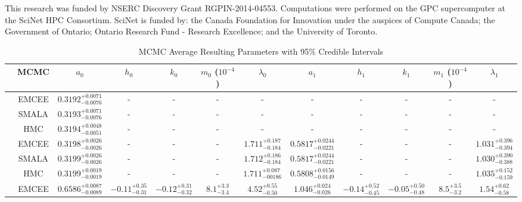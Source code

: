 \documentclass{aa}
\begin{document}
\begin{acknowledgements}
	This research was funded by NSERC Discovery Grant RGPIN-2014-04553. 
Computations were performed on the GPC supercomputer at the SciNet HPC Consortium. 
SciNet is funded by: the Canada Foundation for Innovation under the auspices of Compute Canada; the Government of Ontario; Ontario Research Fund - Research Excellence; and the University of Toronto.
\end{acknowledgements}






\begin{appendix} 

\begin{sidewaystable*}
\caption{MCMC Average Resulting Parameters with 95\% Credible Intervals}\label{Table4}
\centering
\begin{tabular}{c c c c c c c c c c c c}        %
\hline\hline                 %
 & MCMC & $a_0$ & $h_0$ & $k_0$ & $m_0$ ($10^{-4}$) & $\lambda_0$ & $a_1$ & $h_1$ & $k_1$ & $m_1$ ($10^{-4}$) & $\lambda_1$ \\    %
\hline                        %
   \rule{0pt}{4ex}  \multirow{5}{*}{$N=1$} & EMCEE & $0.3192^{+0.0071}_{-0.0076}$ & - & - & - & - & - & - & - & - & - \\
   \rule{0pt}{4ex} & SMALA &  $0.3193^{+0.0071}_{-0.0076}$ & - & - & - & - & - & - & - & - & -\\
    \rule{0pt}{4ex} & HMC &  $0.3194^{+0.0048}_{-0.0051}$ & - & - & - & - & - & - & - & - & -\\
   \rule{0pt}{4ex}  \multirow{5}{*}{$N=4$} & EMCEE & $0.3198^{+0.0026}_{-0.0026}$ & - & - & - & $1.711^{+0.187}_{-0.184}$ & $0.5817^{+0.0244}_{-0.0221}$ & - & - & - & $1.031^{+0.396}_{-0.394}$ \\
   \rule{0pt}{4ex} & SMALA &  $0.3199^{+0.0026}_{-0.0026}$ & - & - & - & $1.712^{+0.186}_{-0.184}$ & $0.5817^{+0.0244}_{-0.0221}$ & - & - & - & $1.030^{+0.390}_{-0.388}$\\
    \rule{0pt}{4ex} & HMC &  $0.3199^{+0.0019}_{-0.0019}$ & - & - & - & $1.711^{+0.087}_{-00186}$ & $0.5808^{+0.0156}_{-0.0149}$ & - & - & - & $1.035^{+0.152}_{-0.159}$\\
   \rule{0pt}{4ex} \multirow{5}{*}{$N=10$} & EMCEE & $0.6586^{+0.0087}_{-0.0089}$ & $-0.11^{+0.35}_{-0.31}$ & $-0.12^{+0.31}_{-0.32}$ & $8.1^{+3.3}_{-3.4}$ & $4.52^{+0.55}_{-0.50}$ & $1.046^{+0.024}_{-0.026}$ & $-0.14^{+0.52}_{-0.45}$ & $-0.05^{+0.50}_{-0.48}$ & $8.5^{+3.5}_{-3.2}$ & $1.54^{+0.62}_{-0.58}$ \\

\end{tabular}
\end{sidewaystable*}
\end{appendix}
\end{document}
